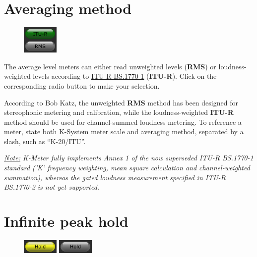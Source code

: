 \section{Averaging method}

\begin{figure}
  \includegraphics[scale=\screenshotscale,clip]{include/images/button_averaging_selection.png}
\end{figure}

The average level meters can either read unweighted levels
(\textbf{RMS}) or loudness-weighted levels according to
\href{http://www.itu.int/rec/R-REC-BS.1770}{ITU-R BS.1770-1}
(\textbf{ITU-R}).  Click on the corresponding radio button to make
your selection.

According to Bob Katz, the unweighted \textbf{RMS} method has been
designed for stereophonic metering and calibration, while the
loudness-weighted \textbf{ITU-R} method should be used for
channel-summed loudness metering.  To reference a meter, state both
K-System meter scale and averaging method, separated by a slash, such
as ``K-20/ITU''.

\emph{\underline{Note:} K-Meter fully implements Annex 1 of the now
  superseded ITU-R BS.1770-1 standard ('K' frequency weighting, mean
  square calculation and channel-weighted summation), whereas the
  gated loudness measurement specified in ITU-R BS.1770-2 is not yet
  supported.}

\section{Infinite peak hold}

\begin{figure}
  \includegraphics[scale=\screenshotscale,clip]{include/images/button_peak_hold_on.png}
  \newline \vspace{-0.9\baselineskip}
  \includegraphics[scale=\screenshotscale,clip]{include/images/button_peak_hold_off.png}
\end{figure}

